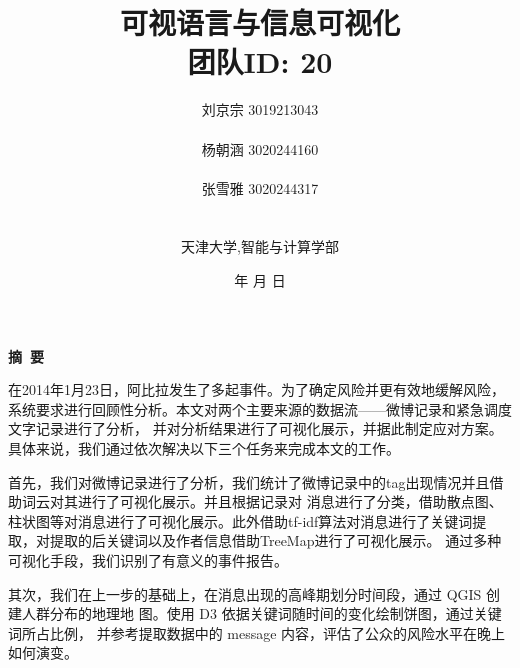 \documentclass[a4paper]{article}
\begin{document}
\renewcommand{\contentsname}{目\ 录}
\renewcommand{\appendixname}{附录}
\renewcommand{\appendixpagename}{附录}
\renewcommand{\refname}{参考文献}

\renewcommand{\tablename}{表}
\renewcommand{\today}{\number\year 年 \number\month 月 \number\day 日}

\title{{\Huge 可视语言与信息可视化{\large\linebreak\\}}{\Large 团队ID: 20\linebreak}
{\Large  \linebreak\linebreak}}
\author{ \large
  刘京宗 3019213043
  \\\\
  杨朝涵 3020244160
  \\\\
  张雪雅 3020244317
  \\\\\\
  天津大学,智能与计算学部}
\date{\today}
\maketitle
\newpage

\begin{center}
  \tableofcontents\label{c}
\end{center}
\newpage


\begin{center}
  {\Large\bf{摘\ 要\\}}
\end{center}

在2014年1月23日，阿比拉发生了多起事件。为了确定风险并更有效地缓解风险，系统要求进行回顾性分析。本文对两个主要来源的数据流——微博记录和紧急调度文字记录进行了分析，
并对分析结果进行了可视化展示，并据此制定应对方案。具体来说，我们通过依次解决以下三个任务来完成本文的工作。

首先，我们对微博记录进行了分析，我们统计了微博记录中的tag出现情况并且借助词云对其进行了可视化展示。并且根据记录对
消息进行了分类，借助散点图、柱状图等对消息进行了可视化展示。此外借助tf-idf算法对消息进行了关键词提取，对提取的后关键词以及作者信息借助TreeMap进行了可视化展示。
通过多种可视化手段，我们识别了有意义的事件报告。

其次，我们在上一步的基础上，在消息出现的高峰期划分时间段，通过 QGIS 创建人群分布的地理地
图。使用 D3 依据关键词随时间的变化绘制饼图，通过关键词所占比例，
并参考提取数据中的 message 内容，评估了公众的风险水平在晚上如何演变。
\end{document}
